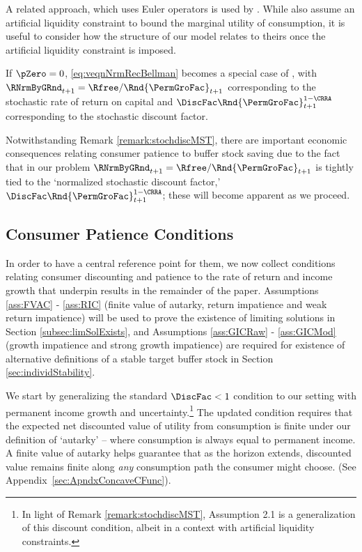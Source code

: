 \documentclass[BufferStockTheory]{subfiles}
\begin{document}
A related approach, which uses Euler operators is used by \cite{mstIncFluct}.
While \cite{mstIncFluct} also assume an artificial liquidity constraint to bound the marginal utility of consumption, it is useful to consider how the structure of our model relates to theirs  once the artificial liquidity constraint is imposed.


\begin{remark}\label{remark:stochdiscMST}
If $\pZero=0$, \eqref{eq:veqnNrmRecBellman} becomes a special case of \cite{mstIncFluct}, with $\RNrmByGRnd_{t+1}=\Rfree/\Rnd{\PermGroFac}_{t+1}$ corresponding to the stochastic rate of return on capital and $\DiscFac \Rnd{\PermGroFac}_{t+1}^{1-\CRRA}$  corresponding to the stochastic discount factor.
\end{remark}

Notwithstanding Remark \ref{remark:stochdiscMST},  there are important economic consequences relating consumer patience to buffer stock saving due to the fact that in our problem $\RNrmByGRnd_{t+1}=\Rfree/\Rnd{\PermGroFac}_{t+1}$ is tightly tied to the `normalized stochastic discount factor,' $\DiscFac \Rnd{\PermGroFac}_{t+1}^{1-\CRRA}$; these will become apparent as we proceed.


\hypertarget{GICTheorySetup}{}
\subsection{Consumer Patience Conditions}\label{subsec:GICTheorySetup}

In order to have a central reference point for them, we now collect conditions relating consumer discounting and patience to the rate of return and income growth that underpin results in the remainder of the paper.
Assumptions \ref{ass:FVAC} - \ref{ass:RIC}  (finite value of autarky, return impatience and weak return impatience) will be used to prove the existence of limiting solutions in Section \ref{subsec:limSolExists}, and Assumptions \ref{ass:GICRaw} - \ref{ass:GICMod} (growth impatience and strong growth impatience) are required for existence of alternative definitions of a stable target buffer stock in Section \ref{sec:individStability}.


We start by generalizing the standard $\DiscFac<1$ condition to our setting with permanent income growth and uncertainty.\footnote{In light of Remark \ref{remark:stochdiscMST}, \cite{mstIncFluct} Assumption 2.1 is a generalization of this discount condition, albeit in a context with artificial liquidity constraints.} The updated condition requires that the expected net discounted value of utility from consumption is finite under our definition of `autarky' -- where consumption is always equal to permanent income.
A finite value of autarky helps guarantee that as the horizon extends, discounted value remains finite along \textit{any} consumption path the consumer might choose.
(See Appendix~\ref{sec:ApndxConcaveCFunc}).
\end{document}
